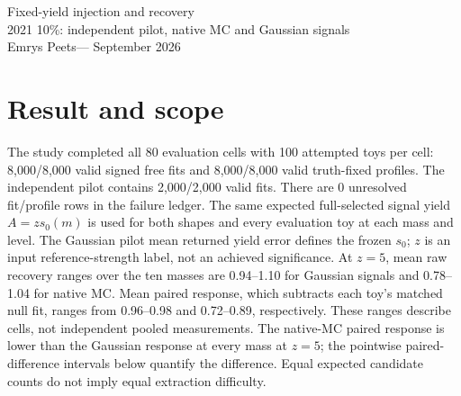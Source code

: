 \documentclass[10pt]{article}
\begin{document}
\begin{center}{\LARGE Fixed-yield injection and recovery}\\[5pt]
{\large 2021 10\%: independent pilot, native MC and Gaussian signals}\\[4pt]
Emrys Peets\quad--- September 2026\end{center}

\section*{Result and scope}
The study completed all 80 evaluation cells with 100 attempted toys per cell: 8,000/8,000 valid signed free fits and 8,000/8,000 valid truth-fixed profiles. The independent pilot contains 2,000/2,000 valid fits. There are 0 unresolved fit/profile rows in the failure ledger. 
The same expected full-selected signal yield $A=z s_0(m)$ is used for both shapes and every evaluation toy at each mass and level. The Gaussian pilot mean returned yield error defines the frozen $s_0$; $z$ is an input reference-strength label, not an achieved significance.
At $z=5$, mean raw recovery ranges over the ten masses are 0.94--1.10 for Gaussian signals and 0.78--1.04 for native MC. Mean paired response, which subtracts each toy's matched null fit, ranges from 0.96--0.98 and 0.72--0.89, respectively. These ranges describe cells, not independent pooled measurements. The native-MC paired response is lower than the Gaussian response at every mass at $z=5$; the pointwise paired-difference intervals below quantify the difference. Equal expected candidate counts do not imply equal extraction difficulty.
\end{document}
